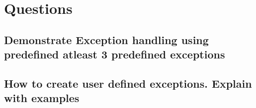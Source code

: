 \documentclass[11pt, a4paper, oneside]{book}
\begin{document}
\newpage
\section{Questions}
\subsection{Demonstrate Exception handling using predefined atleast 3 predefined exceptions}
\subsection{How to create user defined exceptions. Explain with examples}
\end{document}
